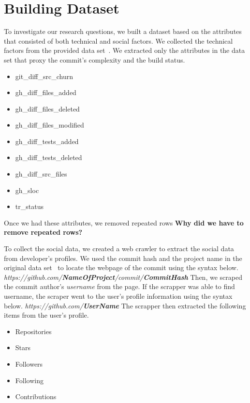 \documentclass[10pt, conference]{IEEEtran}
\newcommand{\todo}[1]
  {{\scriptsize \textbf{\color{red} {#1}}}}
\begin{document}
\section{Building Dataset}
\label{approach}
To investigate our research questions, we built a dataset based on the 
attributes that consisted of both technical and social factors.  We collected
the technical factors from the provided data set~\cite{msr17challenge}.
We extracted only the attributes in the data set that proxy the commit's
complexity and the build status.
\begin{itemize}
\item git\_diff\_src\_churn 
\item gh\_diff\_files\_added 
\item gh\_diff\_files\_deleted 
\item gh\_diff\_files\_modified 
\item gh\_diff\_tests\_added 
\item gh\_diff\_tests\_deleted 
\item gh\_diff\_src\_files 
\item gh\_sloc 
\item tr\_status 
\end{itemize}

Once we had these attributes, we removed repeated rows \todo{Why did we have to
remove repeated rows?}

To collect the social data, we created a web crawler to extract the social data
from developer's profiles.
We used the commit hash and the project name in the original data
set~\cite{msr17challenge} to locate the webpage of the commit using the syntax
below. 
\newline \newline
\textit{https://github.com/\textbf{NameOfProject}/commit/\textbf{CommitHash}}
\newline \newline
Then, we scraped the commit author's
\textit{username} from the page. If the scrapper was able to find username, the
scraper went to the user's profile information using the syntax below.
\newline \newline
\textit{https://github.com/\textbf{UserName}}
\newline \newline
The scrapper then extracted the following items from the user's profile.
\begin{itemize}
\item Repositories
\item Stars
\item Followers
\item Following
\item Contributions 
\end{itemize}
\end{document}
